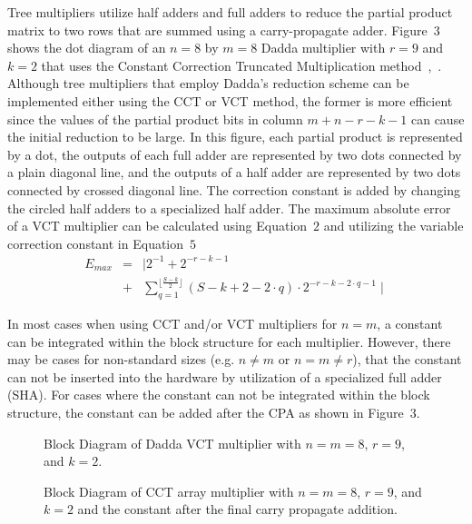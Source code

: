 Tree multipliers
utilize half adders and full adders to reduce the 
partial product matrix to two rows that are summed using a 
carry-propagate adder. 
Figure~$3$ shows the dot diagram of an 
$n=8$ by $m=8$ 
Dadda multiplier with $r=9$ and $k=2$
that uses the Constant Correction Truncated Multiplication
method~\cite{schulte},~\cite{dadda}. 
Although tree multipliers that employ Dadda's reduction scheme can be
implemented either using the CCT or VCT method, the former
is more efficient since
the values of the partial 
product bits in column $m+n-r-k-1$ can cause the initial reduction to be
large.
In this figure, each partial product is 
represented by a dot, the outputs of each full adder are represented 
by two dots connected by a plain diagonal line, and the outputs of a half
adder are represented by two dots connected by crossed diagonal
line. 
The correction constant 
is added by changing the circled half adders to a specialized half adder.
The maximum absolute error of a VCT multiplier can be calculated using Equation~$2$
and utilizing the variable correction constant in Equation~$5$ 
\begin{eqnarray}
E_{max} & = & \mid 2^{-1}  +  2^{-r-k-1}~\nonumber \\
& + & \sum_{q=1}^{\lfloor \frac{S-k}{2} \rfloor}
(S-k+2-2 \cdot q) \cdot 2^{-r - k - 2 \cdot q -1} \mid
\end{eqnarray}

In most cases when using CCT and/or VCT multipliers for $n=m$, a constant
can be integrated within the block structure for each multiplier.
However, there may be cases for non-standard sizes (e.g. $n \neq m$
or $n = m \neq r$), that the constant can not be inserted into
the hardware by utilization of a specialized full adder (SHA). 
For cases where the
constant can not be integrated within the block structure, the
constant can be added after the CPA as shown in Figure~$3$.
\begin{figure} 
\begin{center}
\setlength{\unitlength}{0.0105in}%
\end{center}
\caption{Block Diagram of Dadda VCT multiplier with $n=m=8$, $r=9$, and
$k=2$.}
\end{figure}
\begin{figure}[hbt]
\begin{center}
\setlength{\unitlength}{0.0105in}%
\end{center}
\caption{Block Diagram of CCT array multiplier 
with $n=m=8$, $r=9$, and $k=2$ and the constant after the final carry
propagate addition.}
\end{figure}

